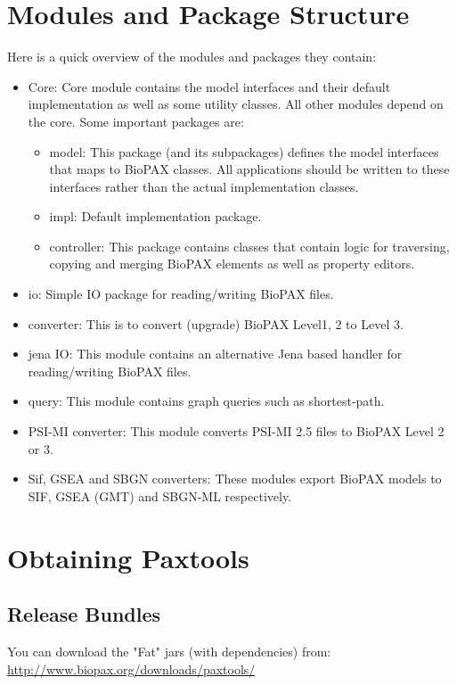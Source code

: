 \documentclass{tufte-book}
\begin{document}
\section{Modules and Package Structure}
Here is a quick overview of the modules and packages they contain:
\begin{itemize}

\item Core: Core module contains the model interfaces and their default implementation as well as some utility classes. All other modules depend on the core. Some important packages are:
	\begin{itemize}
	\item model: This package (and its subpackages) defines the model interfaces that maps to BioPAX classes. All applications should be written to these interfaces rather than the actual implementation classes.
	\item impl: Default implementation package.
	\item controller: This package contains classes that contain logic for traversing, copying and merging BioPAX elements as well as property editors.
	\end{itemize}
\item io: Simple IO package for reading/writing BioPAX files.
\item converter: This is to convert (upgrade) BioPAX Level1, 2 to Level 3.
\item jena IO: This module contains an alternative Jena based handler for reading/writing BioPAX files.
\item query: This module contains graph queries such as shortest-path.
\item PSI-MI converter: This module converts PSI-MI 2.5 files to BioPAX Level 2 or 3.
\item Sif, GSEA and SBGN converters: These modules export BioPAX models to SIF, GSEA (GMT) and SBGN-ML respectively.
\end{itemize}

\section{Obtaining Paxtools}

\subsection{Release Bundles}

You can download the "Fat" jars (with dependencies) from:
	\url{http://www.biopax.org/downloads/paxtools/}
\end{document}
